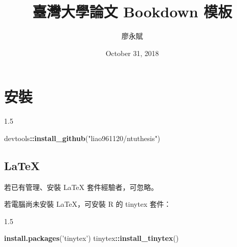 \documentclass[oneside]{book}
\title{臺灣大學論文 Bookdown 模板}
\author{廖永賦}
\date{October 31, 2018}
\newenvironment{Shaded}{\begin{snugshade}}{\end{snugshade}}
\newcommand{\KeywordTok}[1]{\textcolor[rgb]{0.13,0.29,0.53}{\textbf{#1}}}
\newcommand{\StringTok}[1]{\textcolor[rgb]{0.31,0.60,0.02}{#1}}
\newcommand{\OperatorTok}[1]{\textcolor[rgb]{0.81,0.36,0.00}{\textbf{#1}}}
\newcommand{\NormalTok}[1]{#1}
\theoremstyle{definition}
\theoremstyle{definition}
\theoremstyle{definition}
\theoremstyle{remark}
\begin{document}


\clearpage
{}

{}


{}



{}


{}


\clearpage
{}

{
\setcounter{tocdepth}{1}
\tableofcontents
}

\newpage

\listoftables
\newpage
\listoffigures
\newpage

\let\oldShaded=\Shaded
\let\endoldShaded=\endShaded
\renewenvironment{Shaded}{
      \begin{spacing}{1.5}\begin{oldShaded}
    }
  {
  \end{oldShaded}
  \end{spacing}
  }


\chapter{安裝}\label{install}

\begin{Shaded}
\begin{Highlighting}[]
\NormalTok{devtools}\OperatorTok{::}\KeywordTok{install_github}\NormalTok{(}\StringTok{"liao961120/ntuthesis"}\NormalTok{)}
\end{Highlighting}
\end{Shaded}

\section{LaTeX}\label{latex}

若已有管理、安裝 LaTeX 套件經驗者，可忽略。

若電腦尚未安裝 LaTeX，可安裝 R 的 tinytex 套件：

\begin{Shaded}
\begin{Highlighting}[]
\KeywordTok{install.packages}\NormalTok{(}\StringTok{'tinytex'}\NormalTok{)}
\NormalTok{tinytex}\OperatorTok{::}\KeywordTok{install_tinytex}\NormalTok{()}
\end{Highlighting}
\end{Shaded}
\end{document}
